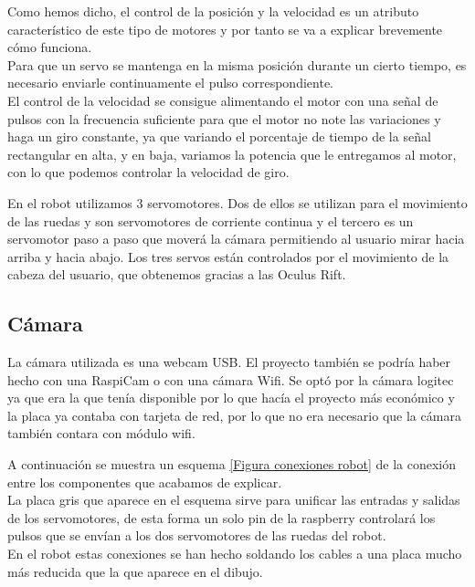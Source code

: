 \documentclass[twoside, 11pt]{epstfg}
\begin{document}
Como hemos dicho, el control de la posición y la velocidad es un atributo característico de este tipo de motores y por tanto se va a explicar brevemente cómo funciona.\\
Para que un servo se mantenga en la misma posición durante un cierto tiempo, es necesario enviarle continuamente el pulso correspondiente.\\
El control de la velocidad se consigue alimentando el motor con una señal de pulsos con la frecuencia suficiente para que el motor no note las variaciones y haga un giro constante, ya que variando el porcentaje de tiempo de la señal rectangular en alta, y en baja, variamos la potencia que le entregamos al motor, con lo que podemos controlar la velocidad de giro.

En el robot utilizamos 3 servomotores.
Dos de ellos se utilizan para el movimiento de las ruedas y son servomotores de corriente continua y el tercero es un servomotor paso a paso que moverá la cámara permitiendo al usuario mirar hacia arriba y hacia abajo.
Los tres servos están controlados por el movimiento de la cabeza del usuario, que obtenemos gracias a las Oculus Rift.

\subsection{Cámara}

La cámara utilizada es una webcam USB. El proyecto también se podría haber hecho con una RaspiCam o con una cámara Wifi. Se optó por la cámara logitec ya que era la que tenía disponible por lo que hacía el proyecto más económico y la placa ya contaba con tarjeta de red, por lo que no era necesario que la cámara también contara con módulo wifi.

A continuación se muestra un esquema \ref{Figura conexiones robot} de la conexión entre los componentes que acabamos de explicar.\\
La placa gris que aparece en el esquema sirve para unificar las entradas y salidas de los servomotores, de esta forma un solo pin de la raspberry controlará los pulsos que se envían a los dos servomotores de las ruedas del robot.\\
En el robot estas conexiones se han hecho soldando los cables a una placa mucho más reducida que la que aparece en el dibujo.
\end{document}
